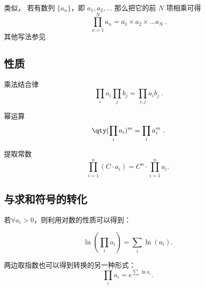 
\begin{issues}
\issueDraft
\end{issues}

类似， 若有数列 $\{a_n\}$，即 $a_1, a_2, \dots$ 那么把它的前 $N$ 项相乘可得
\begin{equation}
\prod_{n = 1}^N a_n = a_1\times a_2\times \dots a_N~.
\end{equation}
其他写法参见
\subsection{性质}

乘法结合律
\begin{equation}
\prod_i a_i \prod_j b_j =  \prod_{i,j} a_i b_j~.
\end{equation}

幂运算
\begin{equation}
\qty(\prod_i a_i)^m =  \prod_i a_i^m~.
\end{equation}

提取常数
\begin{equation}
\prod_{i=1}^n (C \cdot a_i) = C^n \cdot \prod_{i=1}^n a_i.~
\end{equation}

\subsection{与求和符号的转化}

若$\forall a_i > 0$，则利用对数的性质可以得到：

\begin{equation}
\ln \left( \prod_i a_i \right) = \sum_i \ln(a_i).~
\end{equation}

两边取指数也可以得到转换的另一种形式：
\begin{equation}
\prod_i a_i = e^{\displaystyle\sum_i \ln {a_i}}.~
\end{equation}


